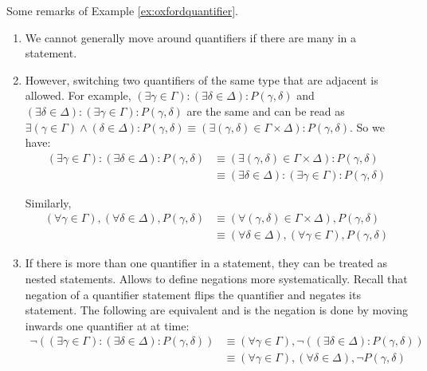 \begin{remark}
    Some remarks of Example \ref{ex:oxfordquantifier}.

    \begin{enumerate}
        \item We cannot generally move around quantifiers if there are many in a statement.

        \item However, switching two quantifiers of the same type that are adjacent is allowed. For example, $( \exists \gamma\in\Gamma ): (\exists \delta\in\Delta):P(\gamma,\delta)$ and $(\exists \delta\in\Delta) : (\exists \gamma\in\Gamma):P(\gamma,\delta)$ are the same and can be read as $\exists(\gamma\in\Gamma)\land(\delta\in\Delta) : P(\gamma,\delta) \equiv (\exists(\gamma,\delta)\in\Gamma\times\Delta):P(\gamma,\delta)$. So we have:
            \begin{align*}
                (\exists\gamma\in\Gamma):(\exists\delta\in\Delta):P(\gamma,\delta) &\equiv (\exists(\gamma,\delta)\in\Gamma\times\Delta):P(\gamma,\delta) \\
                &\equiv (\exists\delta\in\Delta):(\exists\gamma\in\Gamma):P(\gamma,\delta)
            \end{align*}

            Similarly,
            \begin{align*}
                (\forall\gamma\in\Gamma),(\forall \delta\in\Delta),P(\gamma,\delta) &\equiv (\forall(\gamma,\delta)\in\Gamma\times\Delta),P(\gamma,\delta) \\
                &\equiv (\forall \delta\in\Delta),(\forall\gamma\in\Gamma),P(\gamma,\delta)
            \end{align*}

        \item If there is more than one quantifier in a statement, they can be treated as nested statements. Allows to define negations more systematically. Recall that negation of a quantifier statement flips the quantifier and negates its statement. The following are equivalent and is the negation is done by moving inwards one quantifier at at time:
            \begin{align*}
                \neg((\exists\gamma\in\Gamma):(\exists\delta\in\Delta):P(\gamma,\delta)) &\equiv (\forall\gamma\in\Gamma),\neg((\exists\delta\in\Delta):P(\gamma,\delta)) \\
                &\equiv (\forall\gamma\in\Gamma),(\forall\delta\in\Delta),\neg P(\gamma,\delta)
            \end{align*}
            \label{rm:negquantifierremark}
    \end{enumerate}
    \label{rm:quantifierremark}
\end{remark}

